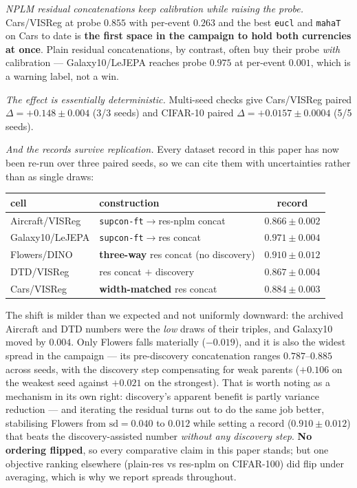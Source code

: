 \documentclass{article}
\begin{document}
\emph{NPLM residual concatenations keep calibration while raising the probe.}
Cars/VISReg at probe $0.855$ with per-event $0.263$ and the best \texttt{eucl}
and \texttt{mahaT} on Cars to date is \textbf{the first space in the campaign to
hold both currencies at once}. Plain residual concatenations, by contrast,
often buy their probe \emph{with} calibration --- Galaxy10/LeJEPA reaches probe
$0.975$ at per-event $0.001$, which is a warning label, not a win.

\emph{The effect is essentially deterministic.} Multi-seed checks give
Cars/VISReg paired $\Delta=+0.148\pm0.004$ (3/3 seeds) and CIFAR-10 paired
$\Delta=+0.0157\pm0.0004$ (5/5 seeds).

\emph{And the records survive replication.} Every dataset record in this paper
has now been re-run over three paired seeds, so we can cite them with
uncertainties rather than as single draws:
\begin{center}\small
\begin{tabular}{llc}
\toprule
cell & construction & record \\
\midrule
Aircraft/VISReg & \texttt{supcon-ft}$\to$res-nplm concat & $0.866\pm0.002$ \\
Galaxy10/LeJEPA & \texttt{supcon-ft}$\to$res concat & $0.971\pm0.004$ \\
Flowers/DINO & \textbf{three-way} res concat (no discovery) & $\mathbf{0.910\pm0.012}$ \\
DTD/VISReg & res concat $+$ discovery & $0.867\pm0.004$ \\
Cars/VISReg & \textbf{width-matched} res concat & $\mathbf{0.884\pm0.003}$ \\
\bottomrule
\end{tabular}
\end{center}
The shift is milder than we expected and not uniformly downward: the archived
Aircraft and DTD numbers were the \emph{low} draws of their triples, and
Galaxy10 moved by $0.004$. Only Flowers falls materially ($-0.019$), and it is
also the widest spread in the campaign --- its pre-discovery concatenation
ranges $0.787$--$0.885$ across seeds, with the discovery step compensating for
weak parents ($+0.106$ on the weakest seed against $+0.021$ on the strongest).
That is worth noting as a mechanism in its own right: discovery's apparent
benefit is partly variance reduction --- and iterating the residual turns out to
do the same job better, stabilising Flowers from $\mathrm{sd}=0.040$ to
$0.012$ while setting a record ($0.910\pm0.012$) that beats the
discovery-assisted number \emph{without any discovery step}.
\textbf{No ordering flipped}, so every
comparative claim in this paper stands; but one objective ranking elsewhere
(plain-res vs res-nplm on CIFAR-100) did flip under averaging, which is why we
report spreads throughout.
\end{document}
